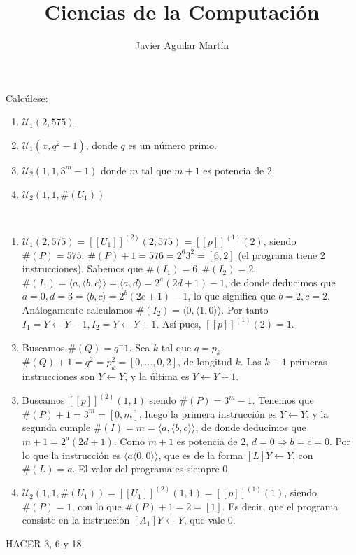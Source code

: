 \documentclass[twoside]{article}
\begin{document}
\title{Ciencias de la Computación}

\author{Javier Aguilar Martín}
\maketitle

\begin{ejercicio}{5}
Calcúlese:
\begin{enumerate}
\item $\mathcal{U}_1(2,575)$.
\item $\mathcal{U}_1(x,q^2-1)$, donde $q$ es un número primo.
\item $\mathcal{U}_2(1,1,3^m-1)$ donde $m$ tal que $m+1$ es potencia de 2.
\item $\mathcal{U}_2(1,1,\#(U_1))$ 
\end{enumerate}
\end{ejercicio}
\begin{solucion}\
\begin{enumerate}
\item  $\mathcal{U}_1(2,575)=[[U_1]]^{(2)}(2,575)=[[p]]^{(1)}(2)$, siendo $\#(P)=575$. $\#(P)+1=576=2^6 3^2=[6,2]$ (el programa tiene 2 instrucciones). Sabemos que $\#(I_1)=6,\#(I_2)=2$.$\#(I_1)=\langle a,\langle b,c\rangle\rangle=\langle a,d\rangle=2^a(2d+1)-1$, de donde deducimos que $a=0,d=3=\langle b,c\rangle=2^b(2c+1)-1$, lo que significa que $b=2,c=2$. Análogamente calculamos $\#(I_2)=\langle 0, \langle 1,0\rangle\rangle$. Por tanto $I_1=Y\leftarrow Y-1, I_2=Y\leftarrow Y+1$. Así pues, $[[p]]^{(1)}(2)=1$. 
\item  Buscamos $\#(Q)=q^-1$. Sea $k$ tal que $q=p_k$. $\#(Q)+1=q^2=p_k^2=[0,\dots,0,2]$, de longitud $k$. Las $k-1$ primeras instrucciones son $Y\leftarrow Y$, y la última es $Y\leftarrow Y+1$. 
\item  Buscamos $[[p]]^{(2)}(1,1)$ siendo $\#(P)=3^m-1$. Tenemos que $\#(P)+1=3^m=[0,m]$, luego la primera instrucción es $Y\leftarrow Y$, y la segunda cumple $\#(I)=m=\langle a,\langle b,c\rangle\rangle$, de donde deducimos que $m+1=2^a(2d+1)$. Como $m+1$ es potencia de 2, $d=0\Rightarrow b=c=0$. Por lo que la instrucción es $\langle a\langle 0,0\rangle\rangle$, que es de la forma $[L] Y\leftarrow Y$, con $\#(L)=a$. El valor del programa es siempre 0.
\item $\mathcal{U}_2(1,1,\#(U_1))=[[U_1]]^{(2)}(1,1)=[[p]]^{(1)}(1)$, siendo $\#(P)=1$, con lo que $\#(P)+1=2=[1]$. Es decir, que el programa consiste en la instrucción $[A_1] Y\leftarrow Y$, que vale 0.
\end{enumerate}
\end{solucion}

\newpage

HACER 3, 6 y 18
\end{document}
